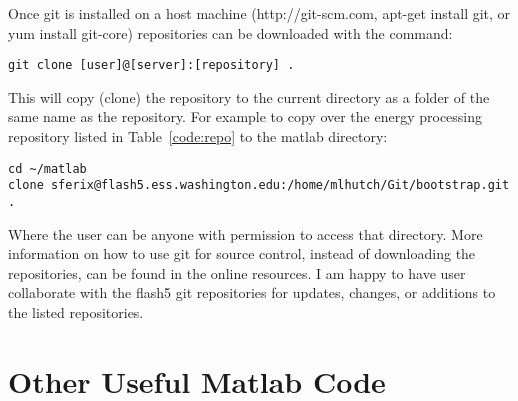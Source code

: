 Once git is installed on a host machine (http://git-scm.com, apt-get install git, or yum install git-core) repositories can be downloaded with the command:

\begin{verbatim}
git clone [user]@[server]:[repository] .
\end{verbatim}

This will copy (clone) the repository to the current directory as a folder of the same name as the repository. 
For example to copy over the energy processing repository listed in Table~\ref{code:repo} to the matlab directory:

\begin{verbatim}
cd ~/matlab
clone sferix@flash5.ess.washington.edu:/home/mlhutch/Git/bootstrap.git .
\end{verbatim}

Where the user can be anyone with permission to access that directory.
More information on how to use git for source control, instead of downloading the repositories, can be found in the online resources.
I am happy to have user collaborate with the flash5 git repositories for updates, changes, or additions to the listed repositories.

\section{Other Useful Matlab Code}
